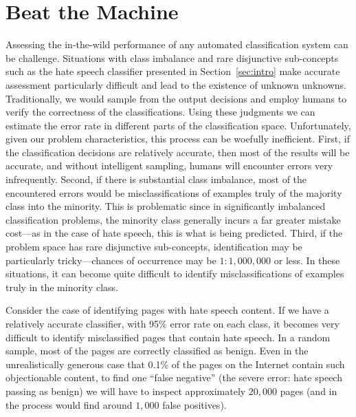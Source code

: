 \section{Beat the Machine}
\label{sec:btm}


Assessing the in-the-wild performance of any automated classification system can be challenge. Situations with class imbalance and rare disjunctive sub-concepts such as the hate speech classifier presented in Section~\ref{sec:intro} make accurate assessment particularly difficult and lead to the existence of unknown unknowns. Traditionally, we would sample from the output decisions and employ humans to verify the correctness of the classifications.  Using these judgments we can estimate the error rate in different parts of the classification space. Unfortunately, given our problem characteristics, this process can be woefully inefficient. First, if the classification decisions are relatively accurate, then most of the results will be accurate, and without intelligent sampling, humans will encounter errors very infrequently. Second, if there is substantial class imbalance, most of the encountered errors would be misclassifications of examples truly of the majority class into the minority. This is problematic since in significantly imbalanced classification problems, the minority class generally incurs a far greater mistake cost---as in the case of hate speech, this is what is being predicted. Third, if the problem space has rare disjunctive sub-concepts, identification may be particularly tricky---chances of occurrence may be $1:1,000,000$ or less. In these situations, it can become quite difficult to identify misclassifications of examples truly in the minority class. 

\begin{xmpl} Consider the case of identifying pages with hate speech content. If we have a relatively accurate classifier, with 95\% error rate on each class, it becomes very difficult to identify misclassified pages that contain hate speech. In a random sample, most of the pages are correctly classified as benign. Even in the unrealistically generous case that 
0.1\% of the pages on the Internet contain such objectionable content, to find one ``false negative'' (the severe error: hate speech passing as benign) we will have to inspect approximately $20,000$ pages (and in the process would find around $1,000$ false positives). 

\end{xmpl} 

